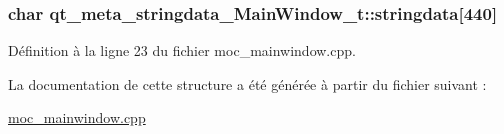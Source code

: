 \hypertarget{structqt__meta__stringdata___main_window__t_ae7c3346f4e1a9ac387ee6447ac66a309}{
\subsubsection[{stringdata}]{\setlength{\rightskip}{0pt plus 5cm}char qt\-\_\-meta\-\_\-stringdata\-\_\-\-Main\-Window\-\_\-t\-::stringdata\mbox{[}440\mbox{]}}}\label{structqt__meta__stringdata___main_window__t_ae7c3346f4e1a9ac387ee6447ac66a309}


Définition à la ligne 23 du fichier moc\-\_\-mainwindow.\-cpp.



La documentation de cette structure a été générée à partir du fichier suivant \-:\begin{DoxyCompactItemize}
\item 
\hyperlink{moc__mainwindow_8cpp}{moc\-\_\-mainwindow.\-cpp}\end{DoxyCompactItemize}
